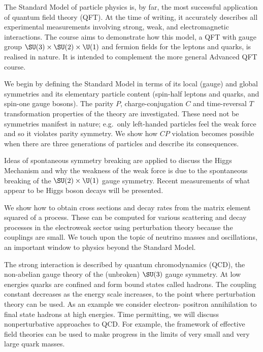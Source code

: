 \documentclass[a4paper]{article}
\begin{document}
\maketitle
{\small
\setlength{\parindent}{0em}
\setlength{\parskip}{1em}
The Standard Model of particle physics is, by far, the most successful application of quantum field theory (QFT). At the time of writing, it accurately describes all experimental measurements involving strong, weak, and electromagnetic interactions. The course aims to demonstrate how this model, a QFT with gauge group $\SU(3) \times \SU(2) \times \U(1)$ and fermion fields for the leptons and quarks, is realised in nature. It is intended to complement the more general Advanced QFT course.

We begin by defining the Standard Model in terms of its local (gauge) and global symmetries and its elementary particle content (spin-half leptons and quarks, and spin-one gauge bosons). The parity $P$, charge-conjugation $C$ and time-reversal $T$ transformation properties of the theory are investigated. These need not be symmetries manifest in nature; e.g.\ only left-handed particles feel the weak force and so it violates parity symmetry. We show how $CP$ violation becomes possible when there are three generations of particles and describe its consequences.

Ideas of spontaneous symmetry breaking are applied to discuss the Higgs Mechanism and why the weakness of the weak force is due to the spontaneous breaking of the $\SU(2) \times \U(1)$ gauge symmetry. Recent measurements of what appear to be Higgs boson decays will be presented.

We show how to obtain cross sections and decay rates from the matrix element squared of a process. These can be computed for various scattering and decay processes in the electroweak sector using perturbation theory because the couplings are small. We touch upon the topic of neutrino masses and oscillations, an important window to physics beyond the Standard Model.

The strong interaction is described by quantum chromodynamics (QCD), the non-abelian gauge theory of the (unbroken) $\SU(3)$ gauge symmetry. At low energies quarks are confined and form bound states called hadrons. The coupling constant decreases as the energy scale increases, to the point where perturbation theory can be used. As an example we consider electron- positron annihilation to final state hadrons at high energies. Time permitting, we will discuss nonperturbative approaches to QCD. For example, the framework of effective field theories can be used to make progress in the limits of very small and very large quark masses.

}
\end{document}
